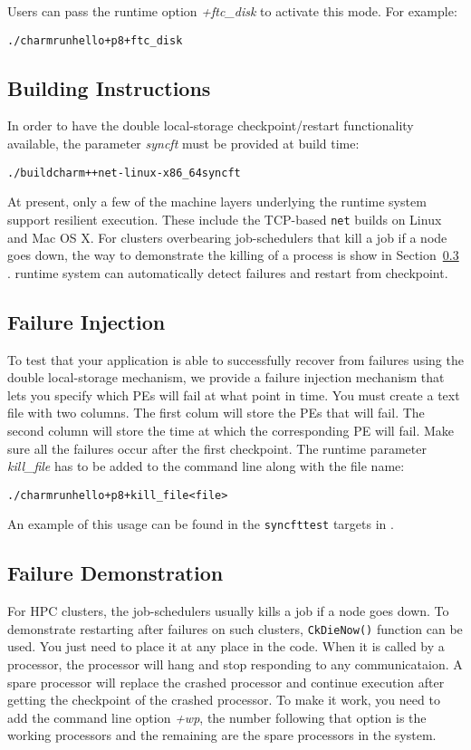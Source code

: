 Users can pass the runtime option {\it +ftc\_disk} to activate this
mode.  For example:

\begin{alltt}
   ./charmrun hello +p8 +ftc_disk
\end{alltt} 

\subsection{Building Instructions}
In order to have the double local-storage checkpoint/restart
functionality available, the parameter \emph{syncft} must be provided
at build time:

\begin{alltt}
   ./build charm++ net-linux-x86_64 syncft
\end{alltt} 

At present, only a few of the machine layers underlying the \charmpp{}
runtime system support resilient execution. These include the
TCP-based \texttt{net} builds on Linux and Mac OS X. For clusters overbearing 
job-schedulers that kill a job if a node goes down, the way to demonstrate the killing 
of a process is show in Section~\ref{ft:inject} . 
\charmpp{} runtime system can automatically detect failures and restart from checkpoint.

\subsection{Failure Injection}
To test that your application is able to successfully recover from
failures using the double local-storage mechanism, we provide a
failure injection mechanism that lets you specify which PEs will fail
at what point in time. You must create a text file with two
columns. The first colum will store the PEs that will fail. The second
column will store the time at which the corresponding PE will
fail. Make sure all the failures occur after the first checkpoint. The
runtime parameter \emph{kill\_file} has to be added to the command
line along with the file name:

\begin{alltt}
   ./charmrun hello +p8 +kill_file <file>
\end{alltt} 

An example of this usage can be found in the \texttt{syncfttest}
targets in .

\subsection{Failure Demonstration}
\label{ft:inject}
For HPC clusters, the job-schedulers usually kills a job if a node goes down. To demonstrate
restarting after failures on such clusters, \texttt{CkDieNow()} function can be used. You just need to place it at any place
in the code. When it is called by a processor, the processor will hang and stop responding to any communicataion.
A spare processor will replace the crashed processor and continue execution after getting the checkpoint of the crashed processor. 
To make it work, you need to add the command line option
\emph{+wp}, the number following that option is the working processors and the remaining 
are the spare processors in the system.
